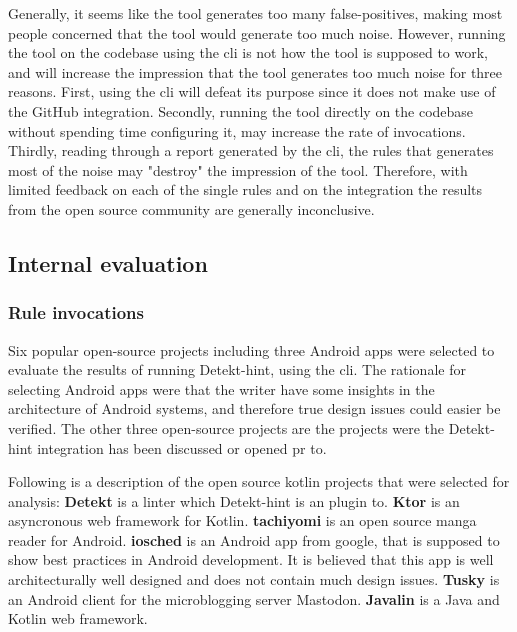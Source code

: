 \documentclass{report}
\begin{document}
Generally, it seems like the tool generates too many false-positives, making most people concerned that the tool would generate too much noise. However, running the tool on the codebase using the \gls{cli} is not how the tool is supposed to work, and will increase the impression that the tool generates too much noise for three reasons. First, using the \gls{cli} will defeat its purpose since it does not make use of the GitHub integration. Secondly, running the tool directly on the codebase without spending time configuring it, may increase the rate of invocations. Thirdly, reading through a report generated by the \gls{cli}, the rules that generates most of the noise may "destroy" the impression of the tool. Therefore, with limited feedback on each of the single rules and on the integration the results from the open source community are generally inconclusive.
 
\subsection{Internal evaluation}
\label{evaluation-internal}
\subsubsection{Rule invocations}
Six popular open-source projects including three Android apps were selected to evaluate the results of running Detekt-hint, using the \gls{cli}. The rationale for selecting Android apps were that the writer have some insights in the architecture of Android systems, and therefore true design issues could easier be verified. The other three open-source projects are the projects were the Detekt-hint integration has been discussed or opened \gls{pr} to. 


Following is a description of the open source kotlin projects that were selected for analysis: \textbf{Detekt} is a linter which Detekt-hint is an plugin to. \textbf{Ktor} is an asyncronous web framework for Kotlin. \textbf{tachiyomi} is an open source manga reader for Android. \textbf{iosched} is an Android app from google, that is supposed to show best practices in Android development. It is believed that this app is well architecturally well designed and does not contain much design issues. \textbf{Tusky} is an Android client for the microblogging server Mastodon. \textbf{Javalin} is a Java and Kotlin web framework. 
\end{document}
